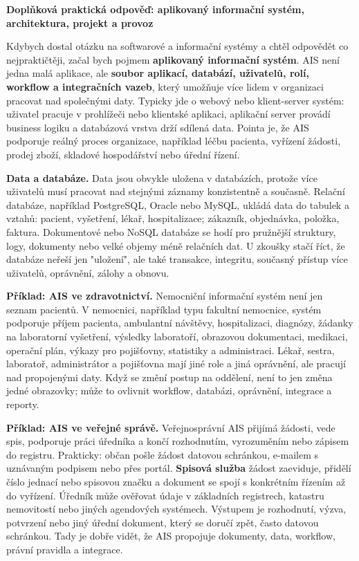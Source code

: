 \documentclass[11pt,a4paper]{article}
\begin{document}
\begin{greenbox}
\textbf{Doplňková praktická odpověď: aplikovaný informační systém, architektura, projekt a provoz}

Kdybych dostal otázku na softwarové a informační systémy a chtěl odpovědět co nejpraktičtěji, začal bych pojmem \textbf{aplikovaný informační systém}. AIS není jedna malá aplikace, ale \textbf{soubor aplikací, databází, uživatelů, rolí, workflow a integračních vazeb}, který umožňuje více lidem v organizaci pracovat nad společnými daty. Typicky jde o webový nebo klient-server systém: uživatel pracuje v prohlížeči nebo klientské aplikaci, aplikační server provádí business logiku a databázová vrstva drží sdílená data. Pointa je, že AIS podporuje reálný proces organizace, například léčbu pacienta, vyřízení žádosti, prodej zboží, skladové hospodářství nebo úřední řízení.

\textbf{Data a databáze.} Data jsou obvykle uložena v databázích, protože více uživatelů musí pracovat nad stejnými záznamy konzistentně a současně. Relační databáze, například PostgreSQL, Oracle nebo MySQL, ukládá data do tabulek a vztahů: pacient, vyšetření, lékař, hospitalizace; zákazník, objednávka, položka, faktura. Dokumentové nebo NoSQL databáze se hodí pro pružnější struktury, logy, dokumenty nebo velké objemy méně relačních dat. U zkoušky stačí říct, že databáze neřeší jen "uložení", ale také transakce, integritu, současný přístup více uživatelů, oprávnění, zálohy a obnovu.

\textbf{Příklad: AIS ve zdravotnictví.} Nemocniční informační systém není jen seznam pacientů. V nemocnici, například typu fakultní nemocnice, systém podporuje příjem pacienta, ambulantní návštěvy, hospitalizaci, diagnózy, žádanky na laboratorní vyšetření, výsledky laboratoří, obrazovou dokumentaci, medikaci, operační plán, výkazy pro pojišťovny, statistiky a administraci. Lékař, sestra, laboratoř, administrátor a pojišťovna mají jiné role a jiná oprávnění, ale pracují nad propojenými daty. Když se změní postup na oddělení, není to jen změna jedné obrazovky; může to ovlivnit workflow, databázi, oprávnění, integrace a reporty.

\textbf{Příklad: AIS ve veřejné správě.} Veřejnosprávní AIS přijímá žádosti, vede spis, podporuje práci úředníka a končí rozhodnutím, vyrozuměním nebo zápisem do registru. Prakticky: občan pošle žádost datovou schránkou, e-mailem s uznávaným podpisem nebo přes portál. \textbf{Spisová služba} žádost zaeviduje, přidělí číslo jednací nebo spisovou značku a dokument se spojí s konkrétním řízením až do vyřízení. Úředník může ověřovat údaje v základních registrech, katastru nemovitostí nebo jiných agendových systémech. Výstupem je rozhodnutí, výzva, potvrzení nebo jiný úřední dokument, který se doručí zpět, často datovou schránkou. Tady je dobře vidět, že AIS propojuje dokumenty, data, workflow, právní pravidla a integrace.


\end{greenbox}
\end{document}

